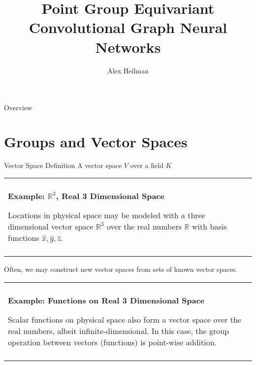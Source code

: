 \documentclass[11pt]{beamer}
\title{Point Group Equivariant Convolutional Graph Neural Networks}
\author{Alex Heilman}
\newenvironment{boxed2}
    {\begin{center}
    \begin{tabular}{|p{0.95\textwidth}|}
    \hline\\
    }
    { 
    \\\\\hline
    \end{tabular} 
    \end{center}
    }
\begin{document}
\begin{frame}
\titlepage
\end{frame}


\begin{frame}{Overview}

\end{frame}

\section{Groups and Vector Spaces}
\begin{frame}{Vector Space Definition}
	A vector space $V$ over a field $K$
	

	\begin{boxed2}
		
		\vspace{-.61cm}
		
		\textbf{Example: $\mathbb{R}^3$, Real 3 Dimensional Space} 
		
		Locations in physical space may be modeled with a three dimensional vector space  $\mathbb{R}^3$ over the real numbers $\mathbb{R}$ with basis functions $\hat{x},\hat{y},\hat{z}$.
		
		\vspace{-.3cm}
		
	\end{boxed2}	
	
	Often, we may construct new vector spaces from sets of known vector spaces.
	
		\begin{boxed2}
		
		\vspace{-.41cm}
		
		\textbf{Example: Functions on Real 3 Dimensional Space} 
		
		Scalar functions on physical space also form a vector space over the real numbers, albeit infinite-dimensional. In this case, the group operation between vectors (functions) is point-wise addition.
		
		\vspace{-.3cm}
		
	\end{boxed2}	
\end{frame}
\end{document}
